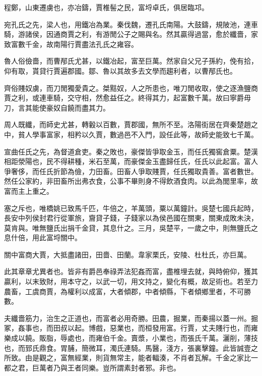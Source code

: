 程鄭，山東遷虜也，亦冶鑄，賈椎髻之民，富埒卓氏，俱居臨邛。

宛孔氏之先，梁人也，用鐵冶為業。秦伐魏，遷孔氏南陽。大鼓鑄，規陂池，連車騎，游諸侯，因通商賈之利，有游閒公子之賜與名。然其贏得過當，愈於纖嗇，家致富數千金，故南陽行賈盡法孔氏之雍容。

魯人俗儉嗇，而曹邴氏尤甚，以鐵冶起，富至巨萬。然家自父兄子孫約，俛有拾，仰有取，貰貸行賈遍郡國。鄒、魯以其故多去文學而趨利者，以曹邴氏也。

齊俗賤奴虜，而刀閒獨愛貴之。桀黠奴，人之所患也，唯刀閒收取，使之逐漁鹽商賈之利，或連車騎，交守相，然愈益任之。終得其力，起富數千萬。故曰寧爵毋刀，言其能使豪奴自饒而盡其力。

周人既纖，而師史尤甚，轉轂以百數，賈郡國，無所不至。洛陽街居在齊秦楚趙之中，貧人學事富家，相矜以久賈，數過邑不入門，設任此等，故師史能致七千萬。

宣曲任氏之先，為督道倉吏。秦之敗也，豪傑皆爭取金玉，而任氏獨窖倉粟。楚漢相距滎陽也，民不得耕種，米石至萬，而豪傑金玉盡歸任氏，任氏以此起富。富人爭奢侈，而任氏折節為儉，力田畜。田畜人爭取賤賈，任氏獨取貴善。富者數世。然任公家約，非田畜所出弗衣食，公事不畢則身不得飲酒食肉。以此為閭里率，故富而主上重之。

塞之斥也，唯橋姚已致馬千匹，牛倍之，羊萬頭，粟以萬鐘計。吳楚七國兵起時，長安中列侯封君行從軍旅，齎貸子錢，子錢家以為侯邑國在關東，關東成敗未決，莫肯與。唯無鹽氏出捐千金貸，其息什之。三月，吳楚平，一歲之中，則無鹽氏之息什倍，用此富埒關中。

關中富商大賈，大抵盡諸田，田嗇、田蘭。韋家栗氏，安陵、杜杜氏，亦巨萬。

此其章章尤異者也。皆非有爵邑奉祿弄法犯姦而富，盡椎埋去就，與時俯仰，獲其贏利，以末致財，用本守之，以武一切，用文持之，變化有概，故足術也。若至力農畜，工虞商賈，為權利以成富，大者傾郡，中者傾縣，下者傾鄉里者，不可勝數。

夫纖嗇筋力，治生之正道也，而富者必用奇勝。田農，掘業，而秦揚以蓋一州。掘冢，姦事也，而田叔以起。博戲，惡業也，而桓發用富。行賈，丈夫賤行也，而雍樂成以饒。販脂，辱處也，而雍伯千金。賣漿，小業也，而張氏千萬。灑削，薄技也，而郅氏鼎食。胃脯，簡微耳，濁氏連騎。馬醫，淺方，張裏擊鐘。此皆誠壹之所致。由是觀之，富無經業，則貨無常主，能者輻湊，不肖者瓦解。千金之家比一都之君，巨萬者乃與王者同樂。豈所謂素封者邪。非也。